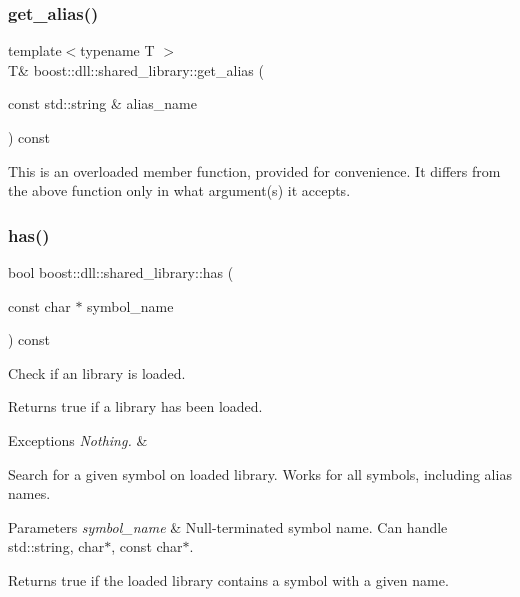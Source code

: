 \subsubsection{\texorpdfstring{get\+\_\+alias()}{get\_alias()}\hspace{0.1cm}{\footnotesize\ttfamily [2/2]}}
{\footnotesize\ttfamily template$<$typename T $>$ \\
T\& boost\+::dll\+::shared\+\_\+library\+::get\+\_\+alias (\begin{DoxyParamCaption}\item[{const std\+::string \&}]{alias\+\_\+name }\end{DoxyParamCaption}) const\hspace{0.3cm}{\ttfamily [inline]}}

This is an overloaded member function, provided for convenience. It differs from the above function only in what argument(s) it accepts. \mbox{\label{a01708_a450d2d74c10dfa790091880d0a95bc1d}} 
\subsubsection{\texorpdfstring{has()}{has()}\hspace{0.1cm}{\footnotesize\ttfamily [1/2]}}
{\footnotesize\ttfamily bool boost\+::dll\+::shared\+\_\+library\+::has (\begin{DoxyParamCaption}\item[{const char $\ast$}]{symbol\+\_\+name }\end{DoxyParamCaption}) const\hspace{0.3cm}{\ttfamily [inline]}}

Check if an library is loaded.

\begin{DoxyReturn}{Returns}
true if a library has been loaded. 
\end{DoxyReturn}

\begin{DoxyExceptions}{Exceptions}
{\em Nothing.} & \\
\hline
\end{DoxyExceptions}
Search for a given symbol on loaded library. Works for all symbols, including alias names.


\begin{DoxyParams}{Parameters}
{\em symbol\+\_\+name} & Null-\/terminated symbol name. Can handle std\+::string, char$\ast$, const char$\ast$. \\
\hline
\end{DoxyParams}
\begin{DoxyReturn}{Returns}
{\ttfamily true} if the loaded library contains a symbol with a given name. 
\end{DoxyReturn}

